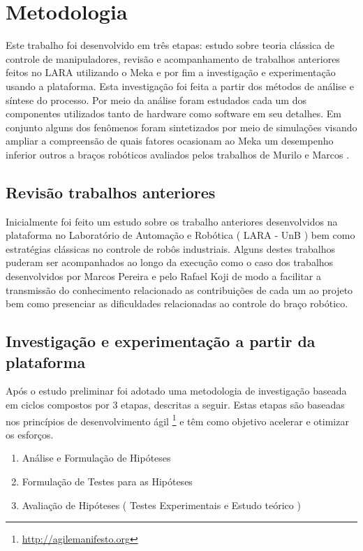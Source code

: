 \section{Metodologia}

Este trabalho foi desenvolvido em três etapas: estudo sobre teoria clássica de controle de manipuladores, revisão e acompanhamento de trabalhos anteriores feitos no LARA utilizando o Meka e por fim a investigação e experimentação usando a plataforma. Esta investigação foi feita a partir dos métodos de análise e síntese do processo. Por meio da análise foram estudados cada um dos componentes utilizados tanto de hardware como software em seu detalhes. Em conjunto alguns dos fenômenos foram sintetizados por meio de simulações visando ampliar a compreensão de quais fatores ocasionam ao Meka um desempenho inferior outros a braços robóticos avaliados pelos trabalhos de Murilo \cite{murlow2014} e Marcos \cite{marcosps2016}.

\subsection{Revisão trabalhos anteriores}

Inicialmente foi feito um estudo sobre os trabalho anteriores desenvolvidos na plataforma no Laboratório de Automação e Robótica ( LARA - UnB ) bem como estratégias clássicas no controle de robôs industriais. Alguns destes trabalhos puderam ser acompanhados ao longo da execução como o caso dos trabalhos desenvolvidos por Marcos Pereira \cite{marcosps2016} e pelo Rafael Koji \cite{koji2017} de modo a facilitar a transmissão do conhecimento relacionado as contribuições de cada um ao projeto bem como presenciar as dificuldades relacionadas ao controle do braço robótico.

\subsection{Investigação e experimentação a partir da plataforma}

Após o estudo preliminar foi adotado uma metodologia de investigação baseada em ciclos compostos por 3 etapas, descritas a seguir. Estas etapas são baseadas nos princípios de desenvolvimento ágil \footnote{\url{http://agilemanifesto.org}} e têm como objetivo acelerar e otimizar os esforços.


\begin{enumerate}
    \item Análise e Formulação de Hipóteses
    \item Formulação de Testes para as Hipóteses
    \item Avaliação de Hipóteses ( Testes Experimentais e Estudo teórico )
\end{enumerate}

